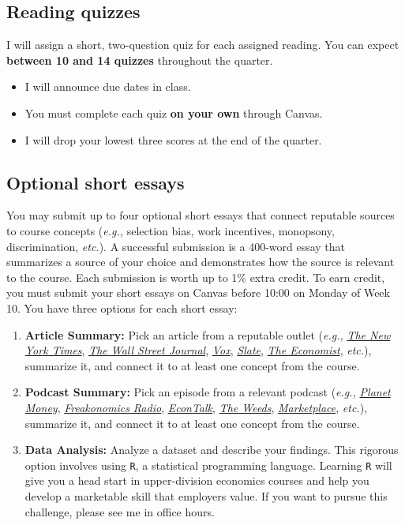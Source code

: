 \documentclass[11pt]{article}
\begin{document}
\subsection*{Reading quizzes} 

I will assign a short, two-question quiz for each assigned reading. You can expect \textbf{between 10 and 14 quizzes} throughout the quarter.
\begin{itemize}
	\setlength{\itemsep}{0pt}
	\item I will announce due dates in class. 
	\item You must complete each quiz \textbf{on your own} through Canvas.
	\item I will drop your lowest three scores at the end of the quarter.
\end{itemize}




\subsection*{Optional short essays}

You may submit up to four optional short essays that connect reputable sources to course concepts (\textit{e.g.,} selection bias, work incentives, monopsony, discrimination, \textit{etc.}). A successful submission is a 400-word essay that summarizes a source of your choice and demonstrates how the source is relevant to the course. Each submission is worth up to 1\% extra credit. To earn credit, you must submit your short essays on Canvas before 10:00 on Monday of Week 10. You have three options for each short essay:

\begin{enumerate}
	\setlength{\itemsep}{0pt}
	\item \textbf{Article Summary:} Pick an article from a reputable outlet (\textit{e.g.,} \href{https://www.nytimes.com/}{\textit{The New York Times}}, \href{https://www.wsj.com/}{\textit{The Wall Street Journal}}, \href{https://www.vox.com/}{\textit{Vox}}, \href{https://slate.com/}{\textit{Slate}}, \href{https://www.economist.com/}{\textit{The Economist}}, \textit{etc.}), summarize it, and connect it to at least one concept from the course.
	\item \textbf{Podcast Summary:} Pick an episode from a relevant podcast (\textit{e.g.,} \href{https://www.npr.org/sections/money/}{\textit{Planet Money}}, \href{https://www.npr.org/podcasts/452538045/freakonomics-radio}{\textit{Freakonomics Radio}}, \href{https://www.econtalk.org/}{\textit{EconTalk}}, \href{https://www.vox.com/the-weeds}{\textit{The Weeds}}, \href{https://www.npr.org/podcasts/381444600/marketplace}{\textit{Marketplace}}, \textit{etc.}), summarize it, and connect it to at least one concept from the course.
	\item \textbf{Data Analysis:} Analyze a dataset and describe your findings. This rigorous option involves using \texttt{R}, a statistical programming language. Learning \texttt{R} will give you a head start in upper-division economics courses and help you develop a marketable skill that employers value. If you want to pursue this challenge, please see me in office hours.
\end{enumerate}
\end{document}
